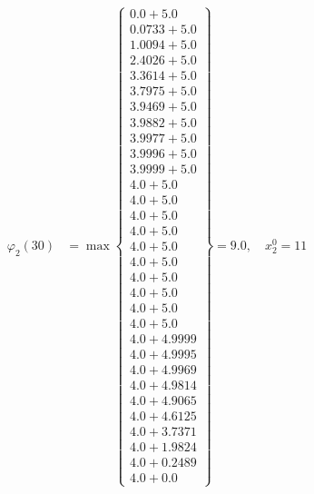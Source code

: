 \documentclass{article}
\begin{document}
\begin{align*}
  
\varphi_{2}(30) &= \max \left\{ \begin{array}{c}
0.0 + 5.0 \\
 0.0733 + 5.0 \\
 1.0094 + 5.0 \\
 2.4026 + 5.0 \\
 3.3614 + 5.0 \\
 3.7975 + 5.0 \\
 3.9469 + 5.0 \\
 3.9882 + 5.0 \\
 3.9977 + 5.0 \\
 3.9996 + 5.0 \\
 3.9999 + 5.0 \\
 4.0 + 5.0 \\
 4.0 + 5.0 \\
 4.0 + 5.0 \\
 4.0 + 5.0 \\
 4.0 + 5.0 \\
 4.0 + 5.0 \\
 4.0 + 5.0 \\
 4.0 + 5.0 \\
 4.0 + 5.0 \\
 4.0 + 5.0 \\
 4.0 + 4.9999 \\
 4.0 + 4.9995 \\
 4.0 + 4.9969 \\
 4.0 + 4.9814 \\
 4.0 + 4.9065 \\
 4.0 + 4.6125 \\
 4.0 + 3.7371 \\
 4.0 + 1.9824 \\
 4.0 + 0.2489 \\
 4.0 + 0.0
\end{array} \right\}=9.0,\quad x_{2}^0=11\\
  
  
  

\end{align*}
\end{document}
